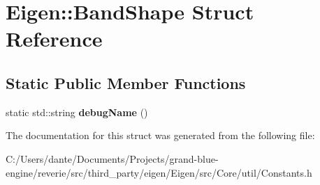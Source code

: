 \hypertarget{struct_eigen_1_1_band_shape}{}\section{Eigen\+::Band\+Shape Struct Reference}
\label{struct_eigen_1_1_band_shape}
\subsection*{Static Public Member Functions}
\begin{DoxyCompactItemize}
\item 
\mbox{\label{struct_eigen_1_1_band_shape_aac060c162decb089ef61c22634a1652f}} 
static std\+::string {\bfseries debug\+Name} ()
\end{DoxyCompactItemize}


The documentation for this struct was generated from the following file\+:\begin{DoxyCompactItemize}
\item 
C\+:/\+Users/dante/\+Documents/\+Projects/grand-\/blue-\/engine/reverie/src/third\+\_\+party/eigen/\+Eigen/src/\+Core/util/Constants.\+h\end{DoxyCompactItemize}
